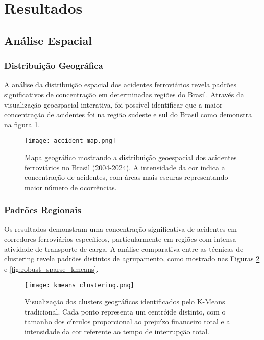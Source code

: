 \documentclass[conference]{IEEEtran}
\begin{document}
\section{Resultados}

\subsection{Análise Espacial}

\subsubsection{Distribuição Geográfica}
A análise da distribuição espacial dos acidentes ferroviários revela padrões significativos de concentração em determinadas regiões do Brasil. Através da visualização geoespacial interativa, foi possível identificar que a maior concentração de acidentes foi na região sudeste e sul do Brasil como demonstra na figura \ref{fig:accident_map}.

\begin{figure}[h]
    \centering
    \texttt{[image: accident\_map.png]}
    \caption{Mapa geográfico mostrando a distribuição geoespacial dos acidentes ferroviários no Brasil (2004-2024). A intensidade da cor indica a concentração de acidentes, com áreas mais escuras representando maior número de ocorrências.}
    \label{fig:accident_map}
\end{figure}


\subsubsection{Padrões Regionais}
Os resultados demonstram uma concentração significativa de acidentes em corredores ferroviários específicos, particularmente em regiões com intensa atividade de transporte de carga. A análise comparativa entre as técnicas de clustering revela padrões distintos de agrupamento, como mostrado nas Figuras \ref{fig:cluster_map} e \ref{fig:robust_sparse_kmeans}.

\begin{figure}[!htb]
    \centering
    \texttt{[image: kmeans\_clustering.png]}
    \caption{Visualização dos clusters geográficos identificados pelo K-Means tradicional. Cada ponto representa um centróide distinto, com o tamanho dos círculos proporcional ao prejuízo financeiro total e a intensidade da cor referente ao tempo de interrupção total.}
    \label{fig:cluster_map}
\end{figure}
\end{document}
